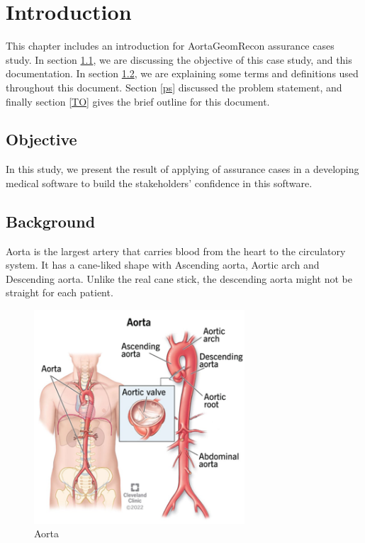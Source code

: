 \chapter{Introduction} \label{intro}
This chapter includes an introduction for AortaGeomRecon assurance cases study. In section \ref{obj}, we are discussing the objective of this case study, and this documentation. In section \ref{bg}, we are explaining some terms and definitions used throughout this document. Section \ref{ps} discussed the problem statement, and finally section \ref{TO} gives the brief outline for this document.

%
%

\section{Objective} \label{obj}
In this study, we present the result of applying of assurance cases in a developing medical software to build the stakeholders' confidence in this software.

\section{Background} \label{bg}
Aorta is the largest artery that carries blood from the heart to the circulatory system. It has a cane-liked shape with Ascending aorta, Aortic arch and Descending aorta. Unlike the real cane stick, the descending aorta might not be straight for each patient. 

\begin{figure}[ht]
    \centering
    \includegraphics[width=0.7\textwidth]{figures/Sample/Aorta.png}
    \caption[Aorta]{Aorta}
    \label{fig_aorta}
\end{figure}

